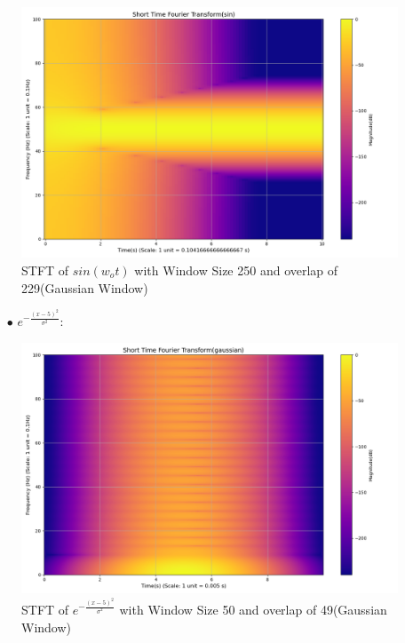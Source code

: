 \documentclass[12pt,a4paper,onecolumn]{exam}
\begin{document}
\begin{solution}
\begin{itemize}
\begin{itemize}
        \begin{figure}[H]
        \centering
        \includegraphics[scale = 0.35]{Gau_Win_sin_21_250.0.png}
        \caption{STFT of $sin(w_ot)$ with Window Size 250 and overlap of 229(Gaussian Window)}
        \label{fig:15}
        \end{figure}
    \begin{itemize}
      \item[$\bullet$] $e^{-\frac{(x-5)^2}{\sigma^2}}$:
    \end{itemize}

        \begin{figure}[H]
        \centering
        \includegraphics[scale = 0.35]{Gau_Win_gaussian_1_50.0.png}
        \caption{STFT of $e^{-\frac{(x-5)^2}{\sigma^2}}$ with Window Size 50 and overlap of 49(Gaussian Window)}
        \label{fig:16}
        \end{figure}


\end{itemize}
\end{itemize}
\end{solution}
\end{document}
